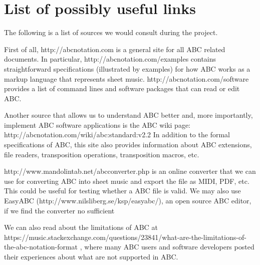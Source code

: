 \section{List of possibly useful links}
The following is a list of sources we would consult during the project. 

First of all, http://abcnotation.com is a general site for all ABC related documents. In particular, http://abcnotation.com/examples contains straightforward specifications (illustrated by examples) for how ABC works as a markup language that represents sheet music. http://abcnotation.com/software provides a list of command lines and software packages that can read or edit ABC. 

Another source that allows us to understand ABC better and, more importantly, implement ABC software applications is the ABC wiki page: http://abcnotation.com/wiki/abc:standard:v2.2 In addition to the formal specifications of ABC, this site also provides information about ABC extensions, file readers, transposition operations, transposition macros, etc. 

http://www.mandolintab.net/abcconverter.php is an online converter that we can use for converting ABC into sheet music and export the file as MIDI, PDF, etc. This could be useful for testing whether a ABC file is valid. We may also use EasyABC (http://www.nilsliberg.se/ksp/easyabc/), an open source ABC editor, if we find the converter no sufficient

We can also read about the limitations of ABC at https://music.stackexchange.com/questions/23841/what-are-the-limitations-of-the-abc-notation-format
, where many ABC users and software developers posted their experiences about what are not supported in ABC.